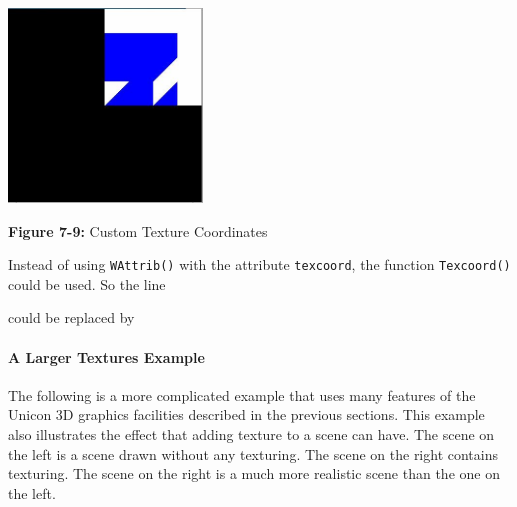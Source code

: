 \bigskip

{\centering 
\includegraphics[width=2.0307in,height=2.0311in]{ub-img/ub-img40.jpg}
\par}

{\sffamily\bfseries Figure 7-9:}
{\sffamily Custom Texture Coordinates}

\bigskip


Instead of using \texttt{WAttrib()} with the attribute \texttt{texcoord},
the function \texttt{Texcoord()} could be used. So the line 


could be replaced by 


\paragraph[A Larger Textures Example]{A Larger Textures Example}
The following is a more complicated example that uses many features of
the Unicon 3D graphics facilities described in the previous sections.
This example also illustrates the effect that adding texture to a scene
can have. The scene on the left is a scene drawn without any texturing.
The scene on the right contains texturing. The scene on the right is a
much more realistic scene than the one on the left. 

